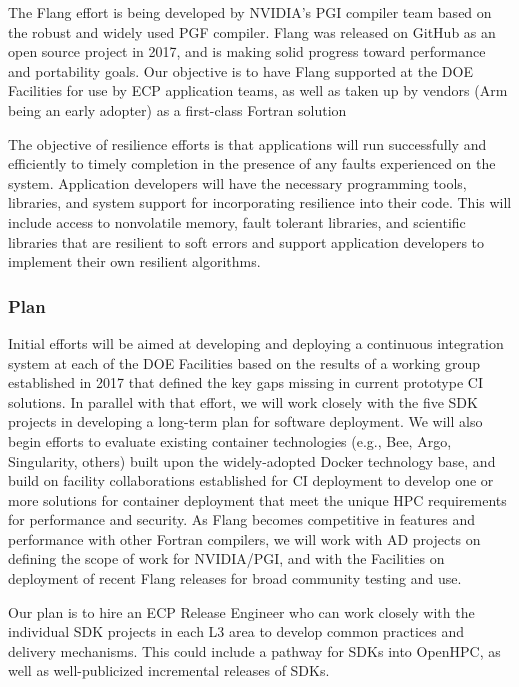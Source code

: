 The Flang effort is being developed by NVIDIA's PGI compiler team based on the robust and widely used PGF compiler. Flang was released on GitHub as an open source project in 2017, and is making solid progress toward performance and portability goals. Our objective is to have Flang supported at the DOE Facilities for use by ECP application teams, as well as taken up by vendors (Arm being an early adopter) as a first-class Fortran solution

The objective of resilience efforts is that applications will run successfully and efficiently to timely completion in the presence of any faults experienced on the system. Application developers will have the necessary programming tools, libraries, and system support for incorporating resilience into their code. This will include access to nonvolatile memory, fault tolerant libraries, and scientific libraries that are resilient to soft errors and support application developers to implement their own resilient algorithms.

\subsubsection{Plan}
Initial efforts will be aimed at developing and deploying a continuous integration system at each of the DOE Facilities based on the results of a working group established in 2017 that defined the key gaps missing in current prototype CI solutions. In parallel with that effort, we will work closely with the five SDK projects in developing a long-term plan for software deployment. We will also begin efforts to evaluate existing container technologies (e.g., Bee, Argo, Singularity, others) built upon the widely-adopted Docker technology base, and build on facility collaborations established for CI deployment to develop one or more solutions for container deployment that meet the unique HPC requirements for performance and security. As Flang becomes competitive in features and performance with other Fortran compilers, we will work with AD projects on defining the scope of work for NVIDIA/PGI, and with the Facilities on deployment of recent Flang releases for broad community testing and use.

Our plan is to hire an ECP Release Engineer who can work closely with the individual SDK projects in each L3 area to develop common practices and delivery mechanisms. This could include a pathway for SDKs into OpenHPC, as well as well-publicized incremental releases of SDKs.

